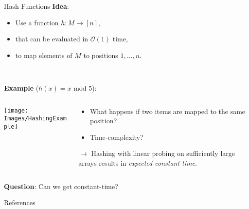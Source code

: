 \documentclass[10pt]{beamer}
\begin{document}
\begin{frame}[fragile]{Hash Functions}
    \textbf{Idea}:
    \vspace{-.75em}
    \begin{itemize}
        \item Use a function $ h : M \to [n] $,
        \item that can be evaluated in $ \mathcal{O}(1) $ time,
        \item to map elements of $ M $ to positions $ 1, \dots, n $.
    \end{itemize}
    \\
    \vfill

    \textbf{Example} ($ h(x) = x \text{ mod } 5 $):
    \begin{columns}[T]
    \begin{column}{.3\textwidth}
        \texttt{[image: Images/HashingExample]}
    \end{column}

    \begin{column}{.5\textwidth}
        \begin{itemize}
            \item What happens if two items are mapped to the same position?
            \item Time-complexity?
        \end{itemize}
        \vspace{3em}
        $ \to $ Hashing with linear probing on sufficiently large arrays results in \textit{expected constant time}.
    \end{column}
    \end{columns}

    \textbf{Question}: Can we get constant-time?
\end{frame}


\begin{frame}[fragile]{References}
    \nocite{*}
    
    
\end{frame}
\end{document}
